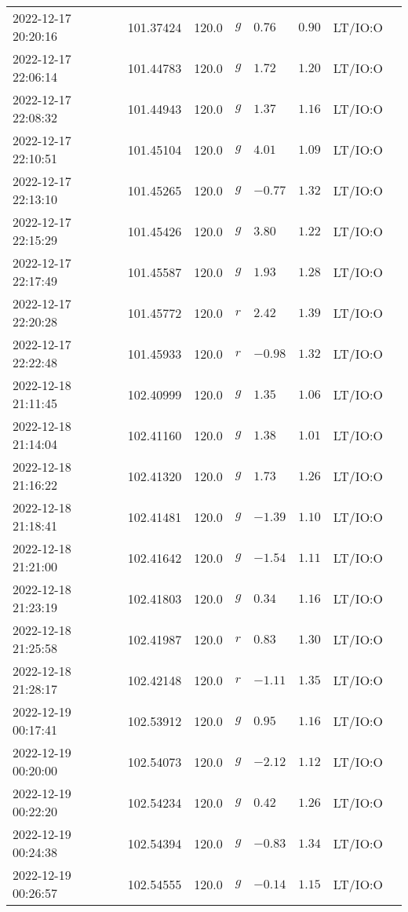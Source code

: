 \documentclass{nature_plusfigure}
\begin{document}
\begin{supplement}
\begin{center}
\begin{longtable}{llllllll}
2022-12-17 20:20:16 & 101.37424 & 120.0 & $g$ & $0.76$ & $0.90$ & LT/IO:O &  \\ 
2022-12-17 22:06:14 & 101.44783 & 120.0 & $g$ & $1.72$ & $1.20$ & LT/IO:O &  \\ 
2022-12-17 22:08:32 & 101.44943 & 120.0 & $g$ & $1.37$ & $1.16$ & LT/IO:O &  \\ 
2022-12-17 22:10:51 & 101.45104 & 120.0 & $g$ & $4.01$ & $1.09$ & LT/IO:O &  \\ 
2022-12-17 22:13:10 & 101.45265 & 120.0 & $g$ & $-0.77$ & $1.32$ & LT/IO:O &  \\ 
2022-12-17 22:15:29 & 101.45426 & 120.0 & $g$ & $3.80$ & $1.22$ & LT/IO:O &  \\ 
2022-12-17 22:17:49 & 101.45587 & 120.0 & $g$ & $1.93$ & $1.28$ & LT/IO:O &  \\ 
2022-12-17 22:20:28 & 101.45772 & 120.0 & $r$ & $2.42$ & $1.39$ & LT/IO:O &  \\ 
2022-12-17 22:22:48 & 101.45933 & 120.0 & $r$ & $-0.98$ & $1.32$ & LT/IO:O &  \\ 
2022-12-18 21:11:45 & 102.40999 & 120.0 & $g$ & $1.35$ & $1.06$ & LT/IO:O &  \\ 
2022-12-18 21:14:04 & 102.41160 & 120.0 & $g$ & $1.38$ & $1.01$ & LT/IO:O &  \\ 
2022-12-18 21:16:22 & 102.41320 & 120.0 & $g$ & $1.73$ & $1.26$ & LT/IO:O &  \\ 
2022-12-18 21:18:41 & 102.41481 & 120.0 & $g$ & $-1.39$ & $1.10$ & LT/IO:O &  \\ 
2022-12-18 21:21:00 & 102.41642 & 120.0 & $g$ & $-1.54$ & $1.11$ & LT/IO:O &  \\ 
2022-12-18 21:23:19 & 102.41803 & 120.0 & $g$ & $0.34$ & $1.16$ & LT/IO:O &  \\ 
2022-12-18 21:25:58 & 102.41987 & 120.0 & $r$ & $0.83$ & $1.30$ & LT/IO:O &  \\ 
2022-12-18 21:28:17 & 102.42148 & 120.0 & $r$ & $-1.11$ & $1.35$ & LT/IO:O &  \\ 
2022-12-19 00:17:41 & 102.53912 & 120.0 & $g$ & $0.95$ & $1.16$ & LT/IO:O &  \\ 
2022-12-19 00:20:00 & 102.54073 & 120.0 & $g$ & $-2.12$ & $1.12$ & LT/IO:O &  \\ 
2022-12-19 00:22:20 & 102.54234 & 120.0 & $g$ & $0.42$ & $1.26$ & LT/IO:O &  \\ 
2022-12-19 00:24:38 & 102.54394 & 120.0 & $g$ & $-0.83$ & $1.34$ & LT/IO:O &  \\ 
2022-12-19 00:26:57 & 102.54555 & 120.0 & $g$ & $-0.14$ & $1.15$ & LT/IO:O &  \\ 

\end{longtable}
\end{center}
\end{supplement}
\end{document}
